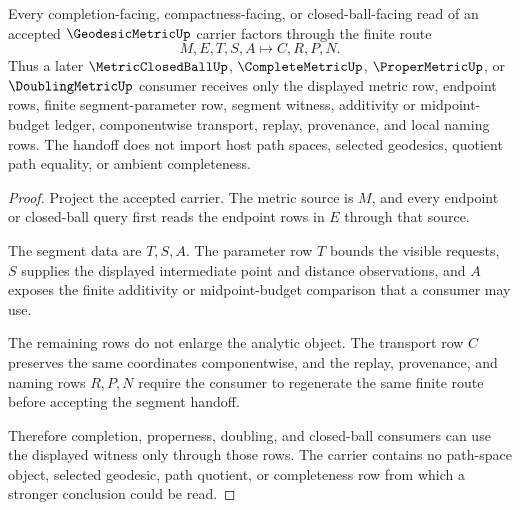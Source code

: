 \begin{theorem}
\label{thm:geodesic-metric-segment-handoff}
Every completion-facing, compactness-facing, or closed-ball-facing read of an accepted $\GeodesicMetricUp$ carrier factors through the finite route
$$
M,E,T,S,A \longmapsto C,R,P,N .
$$
Thus a later $\MetricClosedBallUp$, $\CompleteMetricUp$, $\ProperMetricUp$, or $\DoublingMetricUp$ consumer receives only the displayed metric row, endpoint rows, finite segment-parameter row, segment witness, additivity or midpoint-budget ledger, componentwise transport, replay, provenance, and local naming rows. The handoff does not import host path spaces, selected geodesics, quotient path equality, or ambient completeness.
\end{theorem}
\begin{proof}
Project the accepted carrier. The metric source is $M$, and every endpoint or closed-ball query first reads the endpoint rows in $E$ through that source.

The segment data are $T,S,A$. The parameter row $T$ bounds the visible requests, $S$ supplies the displayed intermediate point and distance observations, and $A$ exposes the finite additivity or midpoint-budget comparison that a consumer may use.

The remaining rows do not enlarge the analytic object. The transport row $C$ preserves the same coordinates componentwise, and the replay, provenance, and naming rows $R,P,N$ require the consumer to regenerate the same finite route before accepting the segment handoff.

Therefore completion, properness, doubling, and closed-ball consumers can use the displayed witness only through those rows. The carrier contains no path-space object, selected geodesic, path quotient, or completeness row from which a stronger conclusion could be read.
\end{proof}

